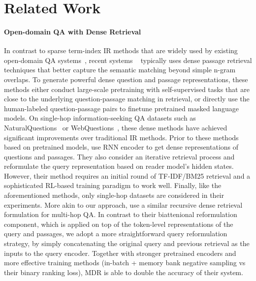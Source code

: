 \documentclass{article} \usepackage{iclr2021_conference,times}
\newcommand{\method}{MDR\xspace}
\begin{document}
\section{Related Work}
\label{sec:related_work}

\paragraph{Open-domain QA with Dense Retrieval}


In contrast to sparse term-index IR methods that are widely used by existing open-domain QA systems~\citep{drqa,wang2017r,yang2019end}, recent systems ~\citep{ORQA,REALM,DPR} typically uses dense passage retrieval techniques that better capture the semantic matching beyond simple n-gram overlaps. To generate powerful dense question and passage representations, these methods either conduct large-scale pretraining with self-supervised tasks that are close to the underlying question-passage matching in retrieval, or directly use the human-labeled question-passage pairs to finetune pretrained masked language models. On single-hop information-seeking QA datasets such as NaturalQuestions~\citep{NQ} or WebQuestions~\citep{WebQ}, these dense methods have achieved significant improvements over traditional IR methods. Prior to these methods based on pretrained models, \citet{das2019multi} use RNN encoder to get dense representations of questions and passages. They also consider an iterative retrieval process and reformulate the query representation based on reader model's hidden states. However, their method requires an initial round of TF-IDF/BM25 retrieval and a sophisticated RL-based training paradigm to work well. Finally, like the aforementioned methods, only single-hop datasets are considered in their experiments. More akin to our approach, \citet{feldman-el-yaniv-2019-multi} use a similar recursive dense retrieval formulation for multi-hop QA. In contrast to their biattenional reformulation component, which is applied on top of the token-level representations of the query and passages, we adopt a more straightforward query reformulation strategy, by simply concatenating the original query and previous retrieval as the inputs to the query encoder. Together with stronger pretrained encoders and more effective training methods (in-batch + memory bank negative sampling  vs their binary ranking loss), \method is able to double the accuracy of their system.  
\end{document}

